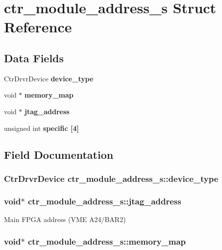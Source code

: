 \section{ctr\_\-module\_\-address\_\-s Struct Reference}
\label{structctr__module__address__s}
\subsection*{Data Fields}
\begin{CompactItemize}
\item 
Ctr\-Drvr\-Device \bf{device\_\-type}
\item 
void $\ast$ \bf{memory\_\-map}
\item 
void $\ast$ \bf{jtag\_\-address}
\item 
unsigned int \bf{specific} [4]
\end{CompactItemize}


\subsection{Field Documentation}
\subsubsection{\setlength{\rightskip}{0pt plus 5cm}Ctr\-Drvr\-Device \bf{ctr\_\-module\_\-address\_\-s::device\_\-type}}\label{structctr__module__address__s_94360a9c04cfb0d1325fae23faba93e3}


\subsubsection{\setlength{\rightskip}{0pt plus 5cm}void$\ast$ \bf{ctr\_\-module\_\-address\_\-s::jtag\_\-address}}\label{structctr__module__address__s_cd12e727e1827a1233802ebe83eee9f8}


Main FPGA address (VME A24/BAR2) 
\subsubsection{\setlength{\rightskip}{0pt plus 5cm}void$\ast$ \bf{ctr\_\-module\_\-address\_\-s::memory\_\-map}}\label{structctr__module__address__s_150805dad67bddcd43be511d59f250ca}


